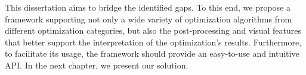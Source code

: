 	This dissertation aims to bridge the identified gaps. To this end, we propose a framework supporting not only a wide variety of optimization algorithms from different optimization categories, but also the post-processing and visual features that better support the interpretation of the optimization's results. Furthermore, to facilitate its usage, the framework should provide an easy-to-use and intuitive \ac{API}. In the next chapter, we present our solution.	
	
		